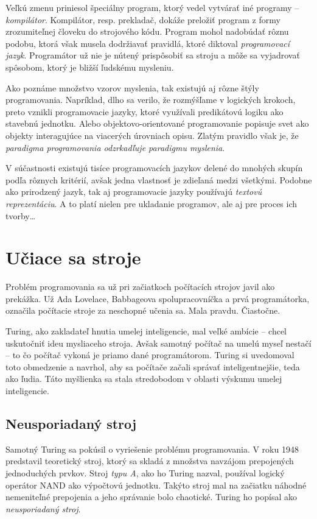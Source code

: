 Veľkú zmenu priniesol špeciálny program, ktorý vedel vytvárať iné programy -- \emph{kompilátor}. Kompilátor, resp. prekladač, dokáže preložiť program z formy zrozumiteľnej človeku do strojového kódu. Program mohol nadobúdať rôznu podobu, ktorá však musela dodržiavať pravidlá, ktoré diktoval \emph{programovací jazyk}. Programátor už nie je nútený prispôsobiť sa stroju a môže sa vyjadrovať spôsobom, ktorý je bližší ľudskému mysleniu.

Ako poznáme množstvo vzorov myslenia, tak existujú aj rôzne štýly programovania. Napríklad, dlho sa verilo, že rozmýšľame v logických krokoch, preto vznikli programovacie jazyky, ktoré využívali predikátovú logiku ako stavebnú jednotku. Alebo objektovo-orientované programovanie popisuje svet ako objekty interagujúce na viacerých úrovniach opisu. Zlatým pravidlo však je, že \emph{paradigma programovania odzrkadľuje paradigmu myslenia}.

V súčastnosti existujú tisíce programovacích jazykov delené do mnohých skupín podľa rôznych kritérií, avšak jedna vlastnosť je zdieľaná medzi všetkými. Podobne ako prirodzený jazyk, tak aj programovacie jazyky používajú \emph{textovú reprezentáciu}. A to platí nielen pre ukladanie programov, ale aj pre proces ich tvorby\dots

\section{Učiace sa stroje}

Problém programovania sa už pri začiatkoch počítacích strojov javil ako prekážka. Už Ada Lovelace, Babbageova spolupracovníčka a prvá programátorka, označila počítacie stroje za neschopné učenia sa. Mala pravdu. Čiastočne.

Turing, ako zakladateľ hnutia umelej inteligencie, mal veľké ambície -- chcel uskutočniť ideu mysliaceho stroja. Avšak samotný počítač na umelú myseľ nestačí -- to čo počítač vykoná je priamo dané programátorom. Turing si uvedomoval toto obmedzenie a navrhol, aby sa počítače začali správať inteligentnejšie, teda ako ľudia. Táto myšlienka sa stala stredobodom v oblasti výskumu umelej inteligencie.

\subsection{Neusporiadaný stroj}

Samotný Turing sa pokúsil o vyriešenie problému programovania. V roku 1948 predstavil teoretický stroj, ktorý sa skladá z množstva navzájom prepojených jednoduchých prvkov. Stroj \emph{typu A}, ako ho Turing nazval, používal logický operátor NAND ako výpočtovú jednotku. Takýto stroj mal na začiatku náhodné nemeniteľné prepojenia a jeho správanie bolo chaotické. Turing ho popísal ako \emph{neusporiadaný stroj}.\autocite{Turing1948}

